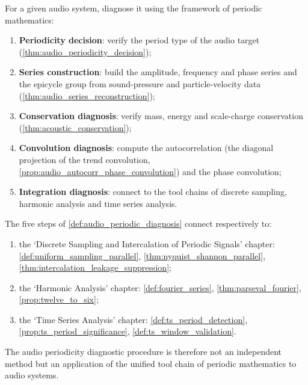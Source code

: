 \begin{definition}\label{def:audio_periodic_diagnosis}
For a given audio system, diagnose it using the framework of periodic mathematics:
\begin{enumerate}[label=(\roman*)]
    \item \textbf{Periodicity decision}: verify the period type of the audio target (\cref{thm:audio_periodicity_decision});
    \item \textbf{Series construction}: build the amplitude, frequency and phase series and the epicycle group from sound-pressure and particle-velocity data (\cref{thm:audio_series_reconstruction});
    \item \textbf{Conservation diagnosis}: verify mass, energy and scale-charge conservation (\cref{thm:acoustic_conservation});
    \item \textbf{Convolution diagnosis}: compute the autocorrelation (the diagonal projection of the trend convolution, \cref{prop:audio_autocorr_phase_convolution}) and the phase convolution;
    \item \textbf{Integration diagnosis}: connect to the tool chains of discrete sampling, harmonic analysis and time series analysis.
\end{enumerate}
\end{definition}

\begin{theorem}\label{thm:audio_diagnosis_integration}
The five steps of \cref{def:audio_periodic_diagnosis} connect respectively to:
\begin{enumerate}[label=(\roman*)]
    \item the `Discrete Sampling and Intercalation of Periodic Signals' chapter: \cref{def:uniform_sampling_parallel}, \cref{thm:nyquist_shannon_parallel}, \cref{thm:intercalation_leakage_suppression};
    \item the `Harmonic Analysis' chapter: \cref{def:fourier_series}, \cref{thm:parseval_fourier}, \cref{prop:twelve_to_six};
    \item the `Time Series Analysis' chapter: \cref{def:ts_period_detection}, \cref{prop:ts_period_significance}, \cref{def:ts_window_validation}.
\end{enumerate}
The audio periodicity diagnostic procedure is therefore not an independent method but an application of the unified tool chain of periodic mathematics to audio systems.
\end{theorem}

